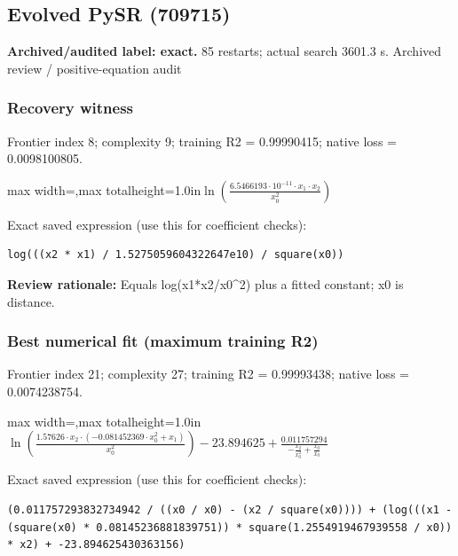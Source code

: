 \documentclass[10pt,letterpaper,landscape]{article}
\begin{document}
\begin{minipage}[t]{0.485\textwidth}
\subsection*{Evolved PySR (709715)}
\textbf{Archived/audited label: exact.} 85 restarts; actual search 3601.3 s.
{\small Archived review / positive-equation audit}
\subsubsection*{Recovery witness}
Frontier index 8; complexity 9; training R2 = 0.99990415; native loss = 0.0098100805.
\begin{center}\begin{adjustbox}{max width=\linewidth,max totalheight=1.0in}$\displaystyle \ln{\left(\frac{6.5466193 \cdot 10^{-11} \cdot x_{1} \cdot x_{2}}{x_{0}^{2}} \right)}$\end{adjustbox}\end{center}
{\scriptsize Exact saved expression (use this for coefficient checks):}
\begin{lstlisting}
log(((x2 * x1) / 1.5275059604322647e10) / square(x0))
\end{lstlisting}
{\small\textbf{Review rationale:} Equals log(x1*x2/x0\textasciicircum{}2) plus a fitted constant; x0 is distance.}
\subsubsection*{Best numerical fit (maximum training R2)}
Frontier index 21; complexity 27; training R2 = 0.99993438; native loss = 0.0074238754.
\begin{center}\begin{adjustbox}{max width=\linewidth,max totalheight=1.0in}$\displaystyle \ln{\left(\frac{1.57626 \cdot x_{2} \cdot \left(- 0.081452369 \cdot x_{0}^{2} + x_{1}\right)}{x_{0}^{2}} \right)} - 23.894625 + \frac{0.011757294}{- \frac{x_{2}}{x_{0}^{2}} + \frac{x_{0}}{x_{0}}}$\end{adjustbox}\end{center}
{\scriptsize Exact saved expression (use this for coefficient checks):}
\begin{lstlisting}
(0.011757293832734942 / ((x0 / x0) - (x2 / square(x0)))) + (log(((x1 - (square(x0) * 0.08145236881839751)) * square(1.2554919467939558 / x0)) * x2) + -23.894625430363156)
\end{lstlisting}
\end{minipage}
\clearpage{}\label{newton-10005}
\end{document}
